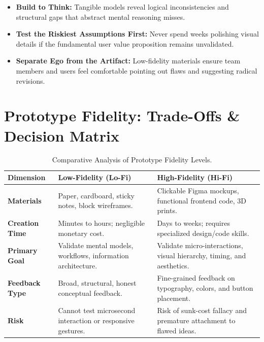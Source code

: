 \begin{definition}
\begin{itemize}[leftmargin=1.2em, itemsep=2pt]
    \item \textbf{Build to Think:} Tangible models reveal logical inconsistencies and structural gaps that abstract mental reasoning misses.
    \item \textbf{Test the Riskiest Assumptions First:} Never spend weeks polishing visual details if the fundamental user value proposition remains unvalidated.
    \item \textbf{Separate Ego from the Artifact:} Low-fidelity materials ensure team members and users feel comfortable pointing out flaws and suggesting radical revisions.
\end{itemize}
\end{definition}

\section{Prototype Fidelity: Trade-Offs \& Decision Matrix}

\begin{table}[h!]
\centering
\small
\renewcommand{\arraystretch}{1.3}
\begin{tabularx}{\linewidth}{p{2.8cm}X X}
\toprule
\textbf{Dimension} & \textbf{Low-Fidelity (Lo-Fi)} & \textbf{High-Fidelity (Hi-Fi)} \\
\midrule
\textbf{Materials} & Paper, cardboard, sticky notes, block wireframes. & Clickable Figma mockups, functional frontend code, 3D prints. \\
\textbf{Creation Time} & Minutes to hours; negligible monetary cost. & Days to weeks; requires specialized design/code skills. \\
\textbf{Primary Goal} & Validate mental models, workflows, information architecture. & Validate micro-interactions, visual hierarchy, timing, and aesthetics. \\
\textbf{Feedback Type} & Broad, structural, honest conceptual feedback. & Fine-grained feedback on typography, colors, and button placement. \\
\textbf{Risk} & Cannot test microsecond interaction or responsive gestures. & Risk of sunk-cost fallacy and premature attachment to flawed ideas. \\
\bottomrule
\end{tabularx}
\caption{Comparative Analysis of Prototype Fidelity Levels.}
\end{table}

